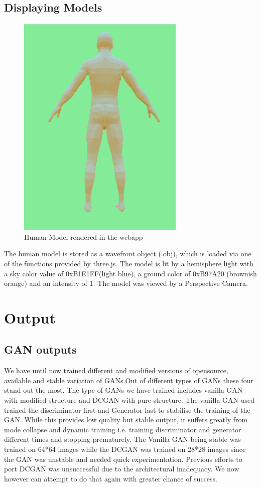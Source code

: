 \documentclass{article}
\begin{document}
  
    
    
\subsection{Displaying Models}

\begin{figure}[H]
    \centering
    \includegraphics[width=8cm]{images/renderedHumanModel.png}
    \caption{Human Model rendered in the webapp}
    \label{fig:my_label}
\end{figure}

The human model is stored as a wavefront object (.obj), which is loaded via one of the functions provided by three.js. The model is lit by a hemisphere light with a sky color value of 0xB1E1FF(light blue), a ground color of 0xB97A20 (brownish orange) and an intensity of 1. The model was viewed by a Perspective Camera.
\newpage    
\section{Output}

\subsection{GAN outputs}

We have until now trained different and modified versions of opensource, available and stable variation of GANs.Out of different types of GANs these four stand out the most. The type of GANs we have trained includes vanilla GAN with modified structure and DCGAN with pure structure. The vanilla GAN used trained the discriminator first and Generator last to stabilise the training of the GAN. While this provides low quality but stable output, it suffers greatly from mode collapse and dynamic training i.e. training discriminator and generator different times and stopping prematurely. The Vanilla GAN being stable was trained on 64*64 images while the DCGAN was trained on 28*28 images since the GAN was unstable and needed quick experimentation. Previous efforts to port DCGAN was unsuccessful due to the architectural inadequacy. We now however can attempt to do that again with greater chance of success.
\end{document}
